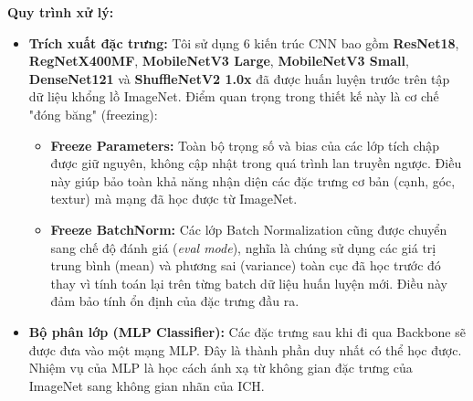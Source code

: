 \newpage
\textbf{Quy trình xử lý:}\vspace{-0.1cm}
\begin{itemize}[label={--}, itemsep=3pt]    
    \item \textbf{Trích xuất đặc trưng:} Tôi sử dụng 6 kiến trúc CNN bao gồm \textbf{ResNet18}, \textbf{RegNetX400MF}, \textbf{MobileNetV3 Large}, \textbf{MobileNetV3 Small}, \textbf{DenseNet121} và \textbf{ShuffleNetV2 1.0x} đã được huấn luyện trước trên tập dữ liệu khổng lồ ImageNet. Điểm quan trọng trong thiết kế này là cơ chế "đóng băng" (freezing):
    \begin{itemize}[label={+}]
        \item \textbf{Freeze Parameters:} Toàn bộ trọng số và bias của các lớp tích chập được giữ nguyên, không cập nhật trong quá trình lan truyền ngược. Điều này giúp bảo toàn khả năng nhận diện các đặc trưng cơ bản (cạnh, góc, textur) mà mạng đã học được từ ImageNet.
        \item \textbf{Freeze BatchNorm:} Các lớp Batch Normalization cũng được chuyển sang chế độ đánh giá (\textit{eval mode}), nghĩa là chúng sử dụng các giá trị trung bình (mean) và phương sai (variance) toàn cục đã học trước đó thay vì tính toán lại trên từng batch dữ liệu huấn luyện mới. Điều này đảm bảo tính ổn định của đặc trưng đầu ra.
    \end{itemize}
    
    \item \textbf{Bộ phân lớp (MLP Classifier):}  Các đặc trưng sau khi đi qua Backbone sẽ được đưa vào một mạng MLP. Đây là thành phần duy nhất có thể học được. Nhiệm vụ của MLP là học cách ánh xạ từ không gian đặc trưng của ImageNet sang không gian nhãn của ICH.
\end{itemize}